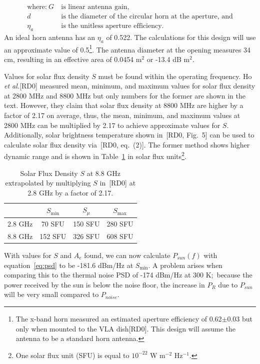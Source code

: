 \documentclass[titlepage]{article}
\newcommand{\nraocite}[1]{[RD0\cite{#1}]}
\newcommand{\nraoprecite}[2][]{[RD0\cite{#2}{, #1}]}
\begin{document}
\begin{align*} 
    \text{where:}~G ~&\text{is linear antenna gain,}\\
           d        ~&\text{is the diameter of the circular horn at the aperture, and}\\
           \eta_a   ~&\text{is the unitless aperture efficiency.}
\end{align*}
An ideal horn antenna has an $\eta_a$ of 0.522. The calculations for this design will use an approximate value of 0.5\footnote{The x-band horn measured an estimated aperture efficiency of 0.62$\pm$0.03 but only when mounted to the VLA dish\nraocite{xbandvla}. This design will assume the antenna to be a standard horn antenna.}. The antenna diameter at the opening measures 34 cm, resulting in an effective area of 0.0454 m$^2$ or -13.4 dB m$^2$.

Values for solar flux density $S$ must be found within the operating frequency. Ho \textit{et al.}\nraocite{solartemp} measured mean, minimum, and maximum values for solar flux density at 2800 MHz and 8800 MHz but only numbers for the former are shown in the text. However, they claim that solar flux density at 8800 MHz are higher by a factor of 2.17 on average, thus, the mean, minimum, and maximum values at 2800 MHz can be multiplied by 2.17 to achieve approximate values for $S$. Additionally, solar brightness temperature shown in~\nraoprecite[Fig.~5]{solartemp} can be used to calculate solar flux density via~\nraoprecite[eq.~(2)]{solartemp}. The former method shows higher dynamic range and is shown in Table~\ref{tab:sfd} in solar flux units\footnote{One solar flux unit (SFU) is equal to $10^{-22}$ W m$^{-2}$ Hz$^{-1}$.}.
\begin{table}[!ht]
\centering
\begin{tabular}{c|c|c|c}
    & $S_{\min}$ & $S_{\mu}$ & $S_{\max}$ \\ \hline
    2.8 GHz & 70 SFU & 150 SFU & 280 SFU \\
    8.8 GHz & 152 SFU & 326 SFU & 608 SFU
\end{tabular}
\caption{Solar Flux Density $S$ at 8.8 GHz extrapolated by multiplying $S$ in~\color{captioncolor}\nraocite{solartemp} at 2.8 GHz by a factor of 2.17.} \label{tab:sfd}
\end{table}

With values for $S$ and $A_e$ found, we can now calculate $P_{sun}(f)$ with equation~\ref{eq:psd} to be -181.6 dBm/Hz at $S_{\min}$. A problem arises when comparing this to the thermal noise PSD of -174 dBm/Hz at 300 K;\ because the power received by the sun is below the noise floor, the increase in $P_R$ due to $P_{sun}$ will be very small compared to $P_{noise}$.
\end{document}
